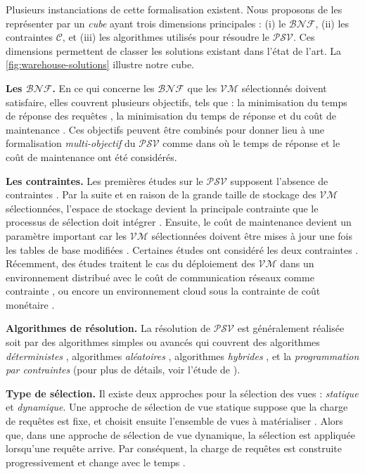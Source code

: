 Plusieurs instanciations de cette formalisation existent. Nous proposons de les représenter par un \textit{cube} ayant trois dimensions principales : (i) le $\mathcal{BNF}$, (ii) les contraintes $\mathcal{C}$, et (iii) les algorithmes utilisés pour résoudre le $\mathcal{PSV}$. Ces dimensions permettent de classer les solutions existant dans l'état de l'art. La \ref{fig:warehouse-solutions} illustre notre cube.

\textbf{Les $\mathcal{BNF}$.} En ce qui concerne les $\mathcal{BNF}$ que les $\mathcal{VM}$ sélectionnés doivent satisfaire, elles couvrent plusieurs objectifs, tels que : la minimisation du temps de réponse des requêtes \cite{Ross96}, la minimisation du temps de réponse et du coût de maintenance \cite{Gupta97}. Ces objectifs peuvent être combinés pour donner lieu à une formalisation \textit{multi-objectif} du $\mathcal{PSV}$ comme dans \cite{Lawrence06} où le temps de réponse et le coût de maintenance ont été considérés.

\textbf{Les contraintes.} Les premières études sur le $\mathcal{PSV}$ supposent l'absence de contraintes \cite{Mistry01}. Par la suite et en raison de la grande taille de stockage des $\mathcal{VM}$ sélectionnées, l'espace de stockage devient la principale contrainte que le processus de sélection doit intégrer \cite{Gupta97}. Ensuite, le coût de maintenance devient un paramètre important car les $\mathcal{VM}$ sélectionnées doivent être mises à jour une fois les tables de base modifiées \cite{Gupta99}. Certaines études ont considéré les deux contraintes \cite{Kalnis02}. Récemment, des études traitent le cas du déploiement des $\mathcal{VM}$ dans un environnement distribué avec le coût de communication réseaux comme contrainte \cite{Chaves09,Mami16}, ou encore un environnement cloud sous la contrainte de coût monétaire \cite{Kehua14}. 

\textbf{Algorithmes de résolution.} 
La résolution de $\mathcal{PSV}$ est généralement réalisée soit par des algorithmes simples ou avancés qui couvrent des algorithmes \textit{déterministes} \cite{Gupta99,Gupta97,Boukorca15}, algorithmes \textit{aléatoires} \cite{Kalnis02,Lawrence06}, algorithmes \textit{hybrides} \cite{Zhang01}, et la \textit{programmation par contraintes} \cite{Mami11,Mami16} (pour plus de détails, voir l'étude de \cite{Mami12,Chirkova11}).

\textbf{Type de sélection.} Il existe deux approches pour la sélection des vues : \textit{statique} et \textit{dynamique}. Une approche de sélection de vue statique suppose que la charge de requêtes est fixe, et choisit ensuite l'ensemble de vues à matérialiser \cite{Yang97,Boukorca15}. Alors que, dans une approche de sélection de vue dynamique, la sélection est appliquée lorsqu'une requête arrive. Par conséquent, la charge de requêtes est construite progressivement et change avec le temps \cite{Kehua14,Kotidis99}.

